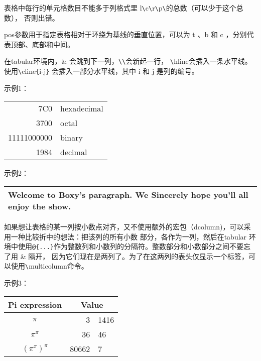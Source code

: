 \documentclass[UTF8]{ctexart}
\begin{document}
\qquad 表格中每行的单元格数目不能多于列格式里 l\texttt{\textbackslash}c\texttt{\textbackslash}r\texttt{\textbackslash}p\texttt{\textbackslash}的总数（可以少于这个总数），
否则出错。

\qquad pos参数用于指定表格相对于环绕为基线的垂直位置，可以为 t 、b 和 c ，分别代表顶部、底部和中间。

\qquad 在tabular环境内，\& 会跳到下一列，\texttt{\textbackslash}\texttt{\textbackslash}会新起一行，
\texttt{\textbackslash}hline会插入一条水平线。使用\texttt{\textbackslash}cline\texttt{\{}i-j\texttt{\}}
会插入一部分水平线，其中 i 和 j 是列的编号。
\newline

示例1：
\newline

\begin{tabular}{|r|l|}
\hline
7C0 & hexadecimal \\
3700 & octal \\ \cline{2-2}
11111000000 & binary \\
\hline \hline
1984 & decimal \\
\hline
\end{tabular}
\newline

示例2：
\newline

\begin{tabular}{|p{4.7cm}|}
\hline
Welcome to Boxy's paragraph.
We Sincerely hope you'll all enjoy the show.\\
\hline
\end{tabular}
\newline

\qquad 如果想让表格的某一列按小数点对齐，又不使用额外的宏包（dcolumn)，可以采用一种比较折中的想法：把该列的所有小数
部分，各作为一列，然后在tabular 环境中使用\texttt{@\{...\}}作为整数列和小数列的分隔符。整数部分和小数部分之间不要忘了用 \& 隔开，
因为它们现在是两列了。为了在这两列的表头仅显示一个标签，可以使用\texttt{\textbackslash}multicolumn命令。
\newline

示例3：
\newline

\begin{tabular}{c r @{.} l}
Pi expression       &
\multicolumn{2}{c}{Value} \\
\hline
$\pi$               & 3&1416 \\
$\pi^{\pi}$         & 36&46  \\
$(\pi^{\pi})^{\pi}$ & 80662&7 \\
\end{tabular}
\newline
\end{document}
